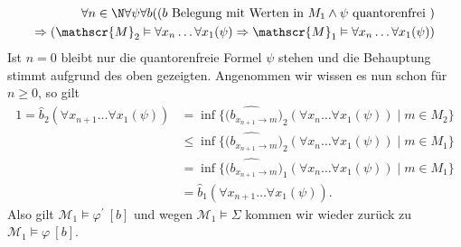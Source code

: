 \begin{solution}
\begin{enumerate}
\begin{align*}
		\forall n \in \N \forall \psi \forall b ((b \text{ Belegung mit Werten in } M_1 \land \psi \text{ quantorenfrei }) \\
		\Rightarrow (\mathscr{M}_2 \vDash \forall x_n \dots \forall x_1 (\psi) \Rightarrow \mathscr{M}_1 \vDash \forall x_n \dots \forall x_1 (\psi))
		\end{align*} 
		Ist $n = 0$ bleibt nur die quantorenfreie Formel $\psi$ stehen und die Behauptung stimmt aufgrund des oben gezeigten. Angenommen wir wissen es nun schon für $n \geq 0$, so gilt
		\begin{align*}
		1 = \widehat{b}_2(\forall x_{n + 1} \dots \forall x_1 (\psi)) &= \inf\{\widehat{(b_{x_{n + 1} \to m}})_2(\forall x_n \dots \forall x_1(\psi)) \mid m \in M_2\} \\
		&\leq \inf\{\widehat{(b_{x_{n + 1} \to m}})_2(\forall x_n \dots \forall x_1(\psi)) \mid m \in M_1\} \\
		&= \inf\{\widehat{(b_{x_{n + 1} \to m}})_1(\forall x_n \dots \forall x_1(\psi)) \mid m \in M_1\} \\
		&= \widehat{b}_1(\forall x_{n + 1} \dots \forall x_1 (\psi)).
		\end{align*}
		Also gilt $\mathscr{M}_1 \vDash \varphi^\prime \ [b]$ und wegen $\mathscr{M}_1 \vDash \Sigma$ kommen wir wieder zurück zu $\mathscr{M}_1 \vDash \varphi \ [b]$. 
		

\end{enumerate}
\end{solution}
